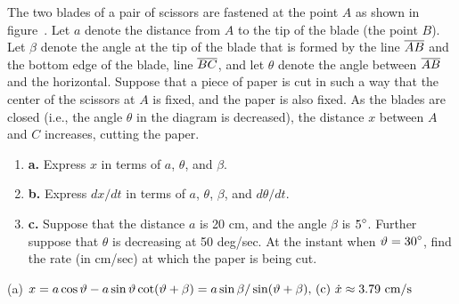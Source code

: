 \begin{exercises}
\begin{exercise}
The two blades of a pair of scissors are fastened at the point $A$ as
shown in figure~.  Let
$a$ denote the distance from $A$ to the tip of the blade (the point $B$).
Let $\beta$ denote the angle at the tip of the blade that is formed by the
line $\displaystyle \overline{AB}$ and the bottom edge of the blade, line
$\displaystyle \overline{BC}$, and let $\theta$ denote the angle between
$\displaystyle \overline{AB}$ and the horizontal.
Suppose that a piece of paper is cut in such a way that the center
of the scissors at $A$ is fixed, and the paper is also fixed.  As the
blades are closed (i.e., the angle $\theta$ in the diagram is decreased),
the distance $x$ between $A$ and $C$ increases, cutting the paper.
\begin{enumerate}
\item{\bf a.} Express $x$ in terms of $a$, $\theta$, and $\beta$.

\item{\bf b.} Express $dx/dt$ in terms of $a$,
$\theta$, $\beta$, and $d\theta/dt$.

\item{\bf c.} Suppose that the distance $a$ is 20 cm, and the
angle $\beta$ is $\displaystyle 5^\circ$.  Further suppose that $\theta$ is
decreasing at 50
deg/sec.  At the instant when $\displaystyle \vartheta=30^\circ$, find the rate (in
cm/sec) at which the paper is being cut.
\end{enumerate}
\begin{answer} (a) $x=a\cos\vartheta-a\sin\vartheta\cot(\vartheta+\beta)=
\hbox{$a\sin\beta/\sin(\vartheta+\beta$), (c) $\displaystyle \dot x\approx 3.79$ cm/s}$
\end{answer}\end{exercise}



\end{exercises}
